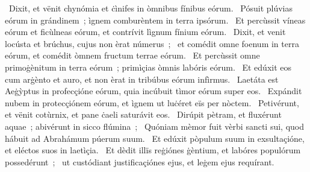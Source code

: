 {~Dixit, et vënit chynómia et ċìnifes in òmnibus fínibus eórum. 
~Pósuit plúvias eórum in grándinem~; ìgnem comburèntem in terra ipsórum. 
~Et percùssit víneas eórum et ficùlneas eórum, et contrívit lìgnum fínium eórum. 
~Dixit, et venit locústa et brúchus, cujus non èrat númerus~; 
~et comédit omne foenum in terra eórum, et comédit òmnem fructum terrae eórum. 
~Et percùssit omne primoġènitum in terra eórum~; primìçias òmnis labóris eórum. 
~Et edúxit eos cum arġènto et auro, et non èrat in tribúbus eórum infìrmus. 
~Laetáta est Aeġỳptus in profecçióne eórum, quia incúbuit tìmor eórum super eos. 
~Expándit nubem in protecçiónem eórum, et ìgnem ut luċéret eïs per nòctem. 
~Petivérunt, et vënit cotùrnix, et pane ċaeli saturávit eos. 
~Dirúpit pètram, et fluxérunt aquae~; abivérunt in sicco flúmina~; 
~Quóniam mèmor fuit vèrbi sancti sui, quod hábuit ad Abrahámum púerum suum. 
~Et edúxit pòpulum suum in exsultaçióne, et eléctos suos in laetìçia. 
~Et dèdit illïs reġiónes ġèntium, et labóres populórum possedérunt~; 
~ut custódiant justificaçiónes ejus, et leġem ejus requírant. 
}
